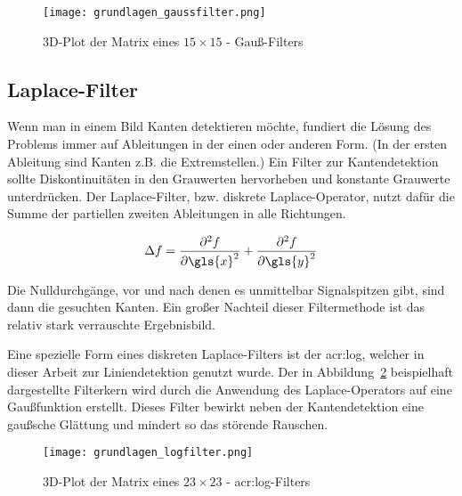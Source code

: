 \begin{figure}[H] %
  \centering
  \texttt{[image: grundlagen\_gaussfilter.png]}
  \caption{3D-Plot der Matrix eines \( 15\times15\) - Gauß-Filters}
  \label{fig:grundlagen_gaussfilter}
\end{figure}  

\subsection{Laplace-Filter}

Wenn man in einem Bild Kanten detektieren möchte, fundiert die Lösung des Problems immer auf Ableitungen in der einen oder anderen Form. (In der ersten Ableitung sind Kanten z.B. die Extremstellen.) Ein Filter zur Kantendetektion sollte Diskontinuitäten in den Grauwerten hervorheben und konstante Grauwerte unterdrücken. Der Laplace-Filter, bzw. diskrete Laplace-Operator, nutzt dafür die Summe der partiellen zweiten Ableitungen in alle Richtungen. \autocite{jaehneDigitaleBildverarbeitungMit2005}

\begin{equation}
\Delta f = \frac{\partial^2 f}{\partial {\gls{x}}^2} + \frac{\partial^2 f}{\partial {\gls{y}}^2}
\end{equation}

Die Nulldurchgänge, vor und nach denen es unmittelbar Signalspitzen gibt, sind dann die gesuchten Kanten. Ein großer Nachteil dieser Filtermethode ist das relativ stark verrauschte Ergebnisbild.

Eine spezielle Form eines diskreten Laplace-Filters ist der \gls{acr:log}, welcher in dieser Arbeit zur Liniendetektion genutzt wurde. Der in Abbildung~\ref{fig:grundlagen_logfilter} beispielhaft dargestellte Filterkern wird durch die Anwendung des Laplace-Operators auf eine Gaußfunktion erstellt. Dieses Filter bewirkt neben der Kantendetektion eine gaußsche Glättung und mindert so das störende Rauschen.

\begin{figure}[H] %
  \centering
  \texttt{[image: grundlagen\_logfilter.png]}
  \caption{3D-Plot der Matrix eines \( 23\times23\) - \gls{acr:log}-Filters}
  \label{fig:grundlagen_logfilter}
\end{figure}  

